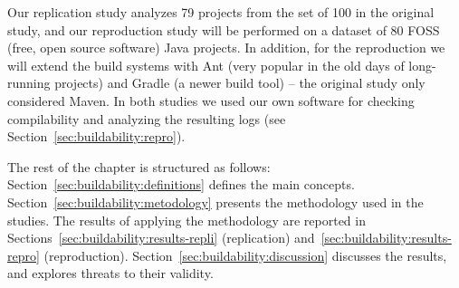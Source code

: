 Our replication study analyzes 79 projects from the set of 100 in the original study, and our reproduction study will be performed on a dataset of 80 FOSS (free, open source software) Java projects. In addition, for the reproduction we will extend the build systems with Ant (very popular in the old days of long-running projects) and Gradle (a newer build tool) -- the original study only considered Maven. In both studies we used our own software for checking compilability and analyzing the resulting logs (see Section~\ref{sec:buildability:repro}).












The rest of the chapter is structured as follows:
Section~\ref{sec:buildability:definitions} defines the main concepts.
Section~\ref{sec:buildability:metodology} presents the methodology used in the studies. 
The results of applying the methodology are reported in Sections~\ref{sec:buildability:results-repli} (replication) and~\ref{sec:buildability:results-repro} (reproduction).
Section~\ref{sec:buildability:discussion} discusses the results, and explores threats to their validity.
